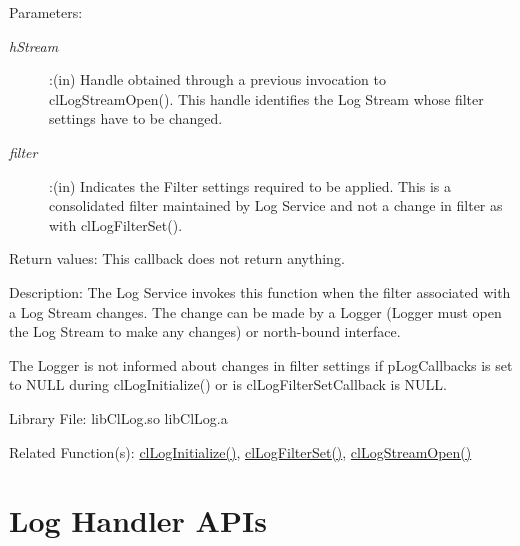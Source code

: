 \begin{flushleft}
\begin{Desc}
\begin{verbatim}
\end{verbatim}
\normalsize
\end{Desc}
\begin{Desc}
\item[Parameters:] \begin{description}
\item[{\em hStream}]:(in) Handle obtained through a previous invocation to clLogStreamOpen(). This handle identifies the Log Stream whose filter 
settings have to be changed.
\item[{\em filter}]:(in) Indicates the Filter settings required to be applied. This is a consolidated filter maintained by Log Service and not 
a change in filter as with clLogFilterSet().
\end{description}
\end{Desc}
\begin{Desc}
\item[Return values:]
This callback does not return anything.
\end{Desc}
\begin{Desc}
\item[Description:] The Log Service invokes this function when the filter associated with a Log Stream changes. The change can be made by a
Logger (Logger must open the Log Stream to make any changes) or north-bound interface. 
\par
The Logger is not informed about changes in filter settings if 
pLogCallbacks is set to NULL during clLogInitialize() 
or is clLogFilterSetCallback is NULL. 
\end{Desc}
\begin{Desc}
\item[Library File:] libClLog.so
\newline
libClLog.a
\end{Desc}
\begin{Desc}
\item[Related Function(s):]\hyperlink{pagelog101}{clLogInitialize()}, \hyperlink{pagelog111}{clLogFilterSet()},
\hyperlink{pagelog106}{clLogStreamOpen()}
\end{Desc}
\newpage



\section{Log Handler APIs}

\end{flushleft}

